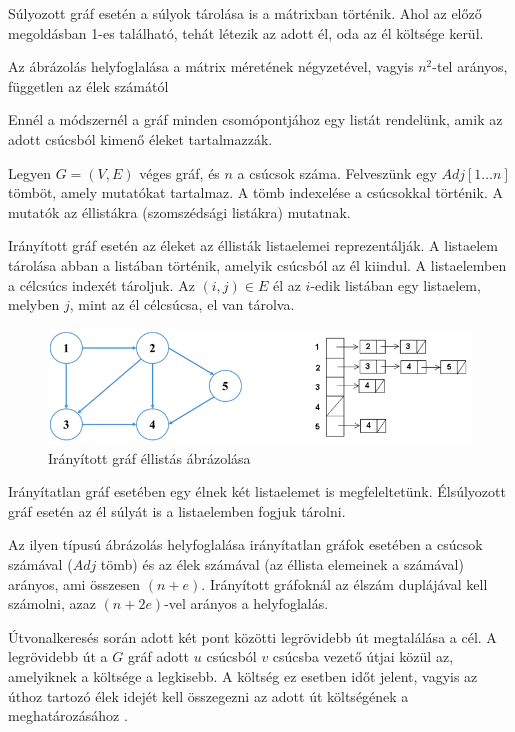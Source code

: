 Súlyozott gráf esetén a súlyok tárolása is a mátrixban történik. Ahol az előző megoldásban 1-es található, tehát létezik az adott él, oda az él költsége kerül.

Az ábrázolás helyfoglalása a mátrix méretének négyzetével, vagyis $n^2$-tel arányos, független az élek számától


Ennél a módszernél a gráf minden csomópontjához egy listát rendelünk, amik az adott csúcsból kimenő éleket tartalmazzák.

Legyen $G = (V, E)$ véges gráf, és $n$ a csúcsok száma. Felveszünk egy $Adj[1 \ldots n]$ tömböt, amely mutatókat tartalmaz. A tömb indexelése a csúcsokkal történik. A mutatók az éllistákra (szomszédsági listákra) mutatnak.

Irányított gráf esetén az éleket az éllisták listaelemei reprezentálják. A listaelem tárolása abban a listában történik, amelyik csúcsból az él kiindul. A listaelemben a célcsúcs indexét tároljuk. Az $(i, j) \in E$ él az $i$-edik listában egy listaelem, melyben $j$, mint az él célcsúcsa, el van tárolva.

\begin{figure}[htb]
\centering
\includegraphics[scale=1.5]{kepek/ellista_iranyitott.png}
\caption{Irányított gráf éllistás ábrázolása}
\label{fig:ellista_iranyitott}
\end{figure}

Irányítatlan gráf esetében egy élnek két listaelemet is megfeleltetünk. Élsúlyozott gráf esetén az él súlyát is a listaelemben fogjuk tárolni.

Az ilyen típusú ábrázolás helyfoglalása irányítatlan gráfok esetében a csúcsok számával ($Adj$ tömb) és az élek számával (az éllista elemeinek a számával) arányos, ami összesen $(n + e)$. Irányított gráfoknál az élszám duplájával kell számolni, azaz $(n + 2e)$-vel arányos a helyfoglalás.


Útvonalkeresés során adott két pont közötti legrövidebb út megtalálása a cél. A legrövidebb út a $G$ gráf adott $u$ csúcsból $v$ csúcsba vezető útjai közül az, amelyiknek a költsége a legkisebb. A költség ez esetben időt jelent, vagyis az úthoz tartozó élek idejét kell összegezni az adott út költségének a meghatározásához \cite{legrovidebbut}.

